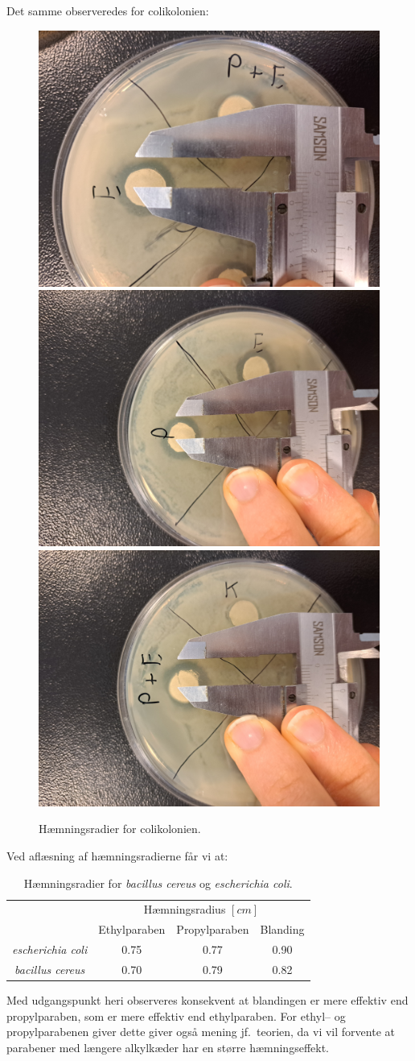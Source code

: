     Det samme observeredes for colikolonien:
    \begin{figure}[H]\centering
        \includegraphics[width=.32\textwidth]{billeder/colie}
        \includegraphics[width=.32\textwidth]{billeder/colip}
        \includegraphics[width=.32\textwidth]{billeder/colipe}
        \caption{Hæmningsradier for colikolonien.}
    \end{figure}
    Ved aflæsning af hæmningsradierne får vi at:
    \begin{table}[H]\centering
        \caption{Hæmningsradier for \textit{bacillus cereus} og \textit{escherichia coli}.}
        \begin{tabular}{cccc}
            \toprule
            & \multicolumn{3}{c}{Hæmningsradius $\left[\si{cm}\right]$} \\
            \cmidrule(r){2-4}
            & Ethylparaben & Propylparaben & Blanding \\
            \midrule
            \textit{escherichia coli} & 0.75 & 0.77 & 0.90 \\
            \textit{bacillus cereus} & 0.70 & 0.79 & 0.82 \\
            \bottomrule
        \end{tabular}
    \end{table}
    Med udgangspunkt heri observeres konsekvent at blandingen er mere effektiv end propylparaben, som er mere effektiv end ethylparaben. For ethyl-- og propylparabenen giver dette giver også mening jf.\ teorien, da vi vil forvente at parabener med længere alkylkæder har en større hæmningseffekt. 
    
